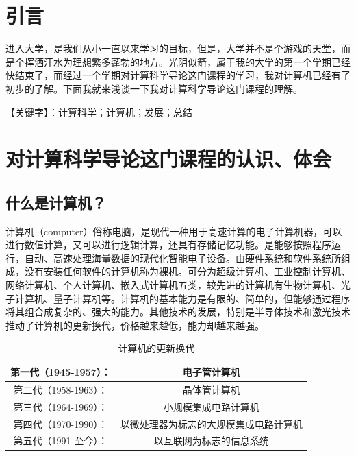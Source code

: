 \documentclass{article}
\begin{document}
\thispagestyle{empty}
\newpage
\setcounter{page}{1}
\section{引言}
进入大学，是我们从小一直以来学习的目标，但是，大学并不是个游戏的天堂，而是个挥洒汗水为理想繁多蓬勃的地方。光阴似箭，属于我的大学的第一个学期已经快结束了，而经过一个学期对计算科学导论这门课程的学习，我对计算机已经有了初步的了解。下面我就来浅谈一下我对计算科学导论这门课程的理解。

【关键字】：计算科学；计算机；发展；总结

\section{对计算科学导论这门课程的认识、体会}


\subsection{什么是计算机？}
计算机（computer）俗称电脑，是现代一种用于高速计算的电子计算机器，可以进行数值计算，又可以进行逻辑计算，还具有存储记忆功能。是能够按照程序运行，自动、高速处理海量数据的现代化智能电子设备。由硬件系统和软件系统所组成，没有安装任何软件的计算机称为裸机。可分为超级计算机、工业控制计算机、网络计算机、个人计算机、嵌入式计算机五类，较先进的计算机有生物计算机、光子计算机、量子计算机等。计算机的基本能力是有限的、简单的，但能够通过程序将其组合成复杂的、强大的能力。其他技术的发展，特别是半导体技术和激光技术推动了计算机的更新换代，价格越来越低，能力却越来越强。



\begin{table}[!htbp]
    \centering
    \renewcommand{\arraystretch}{2}
\begin{tabular}{|c|c|}
    \hline
    第一代（1945-1957）： &电子管计算机 \\
    \hline
    第二代（1958-1963）： & 晶体管计算机 \\ \hline
    第三代（1964-1969）： & 小规模集成电路计算机 \\ \hline
    第四代（1970-1990）： & 以微处理器为标志的大规模集成电路计算机\\ 
    \hline
    第五代（1991-至今）： & 以互联网为标志的信息系统\\ \hline
\end{tabular}
    \label{table1}\caption{计算机的更新换代}
\end{table}
\end{document}
